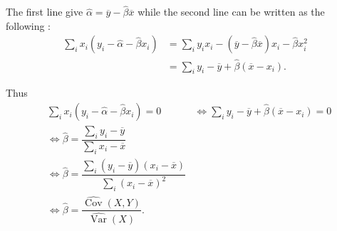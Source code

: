 The first line give $\hat{\alpha} = \overline{y} - \hat{\beta} \overline{x}$ while the second line can be written as the following : 
\begin{equation*}
\begin{aligned}
    \sum_i x_i (y_i - \hat{\alpha} - \hat{\beta} x_i) &= \sum_i y_i x_i - (\overline{y} - \hat{\beta} \overline{x})x_i - \hat{\beta} x_i^2\\
    &= \sum_i y_i - \overline{y} + \hat{\beta} (\overline{x} - x_i).
\end{aligned}
\end{equation*}

Thus 
\begin{equation*}
\begin{aligned}
    &\sum_i x_i (y_i - \hat{\alpha} - \hat{\beta} x_i) = 0 &\Leftrightarrow \sum_i y_i - \overline{y} + \hat{\beta} (\overline{x} - x_i) = 0\\
    &\Leftrightarrow \hat{\beta} = \dfrac{\sum_i y_i - \overline{y}}{\sum_i x_i - \overline{x}}\\
    &\Leftrightarrow \hat{\beta} = \dfrac{\sum_i (y_i - \overline{y})(x_i-\overline{x})}{\sum_i (x_i - \overline{x})^2}\\
    &\Leftrightarrow \boxed{\hat{\beta} = \dfrac{\widehat{\operatorname{Cov}}(X, Y)}{\widehat{\operatorname{Var}}(X)}.}
\end{aligned}
\end{equation*}



